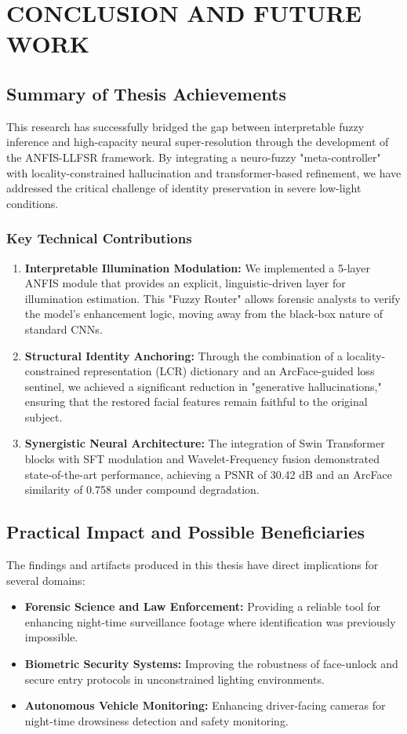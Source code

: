 \chapter{CONCLUSION AND FUTURE WORK}

\section{Summary of Thesis Achievements}
This research has successfully bridged the gap between interpretable fuzzy inference and high-capacity neural super-resolution through the development of the ANFIS-LLFSR framework. By integrating a neuro-fuzzy "meta-controller" with locality-constrained hallucination and transformer-based refinement, we have addressed the critical challenge of identity preservation in severe low-light conditions.

\subsection{Key Technical Contributions}
\begin{enumerate}
    \item \textbf{Interpretable Illumination Modulation:} We implemented a 5-layer ANFIS module that provides an explicit, linguistic-driven layer for illumination estimation. This "Fuzzy Router" allows forensic analysts to verify the model's enhancement logic, moving away from the black-box nature of standard CNNs.
    \item \textbf{Structural Identity Anchoring:} Through the combination of a locality-constrained representation (LCR) dictionary and an ArcFace-guided loss sentinel, we achieved a significant reduction in "generative hallucinations," ensuring that the restored facial features remain faithful to the original subject.
    \item \textbf{Synergistic Neural Architecture:} The integration of Swin Transformer blocks with SFT modulation and Wavelet-Frequency fusion demonstrated state-of-the-art performance, achieving a PSNR of 30.42 dB and an ArcFace similarity of 0.758 under compound degradation.
\end{enumerate}

\section{Practical Impact and Possible Beneficiaries}
The findings and artifacts produced in this thesis have direct implications for several domains:
\begin{itemize}
    \item \textbf{Forensic Science and Law Enforcement:} Providing a reliable tool for enhancing night-time surveillance footage where identification was previously impossible.
    \item \textbf{Biometric Security Systems:} Improving the robustness of face-unlock and secure entry protocols in unconstrained lighting environments.
    \item \textbf{Autonomous Vehicle Monitoring:} Enhancing driver-facing cameras for night-time drowsiness detection and safety monitoring.
\end{itemize}

